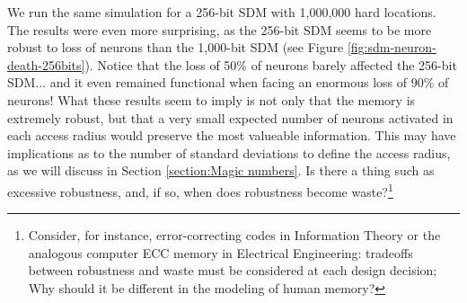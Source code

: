 We run the same simulation for a 256-bit SDM with 1,000,000 hard locations. The results were even more surprising, as the 256-bit SDM seems to be more robust to loss of neurons than the 1,000-bit SDM (see Figure \ref{fig:sdm-neuron-death-256bits}). Notice that the loss of 50\% of neurons barely affected the 256-bit SDM... and it even remained functional when facing an enormous loss of 90\% of neurons!  What these results seem to imply is not only that the memory is extremely robust, but that a very small expected number of neurons activated in each access radius would preserve the most valueable information.  This may have implications as to the number of standard deviations to define the access radius, as we will discuss in Section \ref{section:Magic numbers}.  Is there a thing such as excessive robustness, and, if so, when does robustness become waste?\footnote{Consider, for instance, error-correcting codes in Information Theory or the analogous computer ECC memory in Electrical Engineering: tradeoffs between robustness and waste must be considered at each design decision; Why should it be different in the modeling of human memory?}

